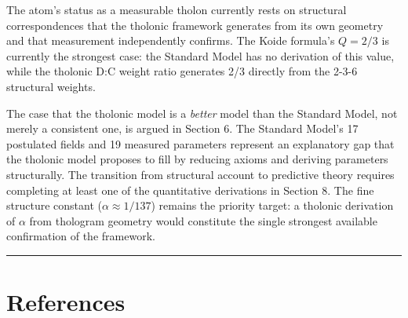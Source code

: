 \documentclass[12pt]{article}
\begin{document}
The atom's status as a measurable tholon currently rests on structural
correspondences that the tholonic framework generates from its own
geometry and that measurement independently confirms. The Koide
formula's \(Q = 2/3\) is currently the strongest case: the Standard
Model has no derivation of this value, while the tholonic D:C weight
ratio generates 2/3 directly from the 2-3-6 structural weights.

The case that the tholonic model is a \emph{better} model than the
Standard Model, not merely a consistent one, is argued in Section 6. The
Standard Model's 17 postulated fields and 19 measured parameters
represent an explanatory gap that the tholonic model proposes to fill by
reducing axioms and deriving parameters structurally. The transition
from structural account to predictive theory requires completing at
least one of the quantitative derivations in Section 8. The fine
structure constant (\(\alpha \approx 1/137\)) remains the priority
target: a tholonic derivation of \(\alpha\) from thologram geometry
would constitute the single strongest available confirmation of the
framework.

\begin{center}\rule{0.5\linewidth}{0.5pt}\end{center}

\section{References}\label{references-and-source-materials}
\end{document}
